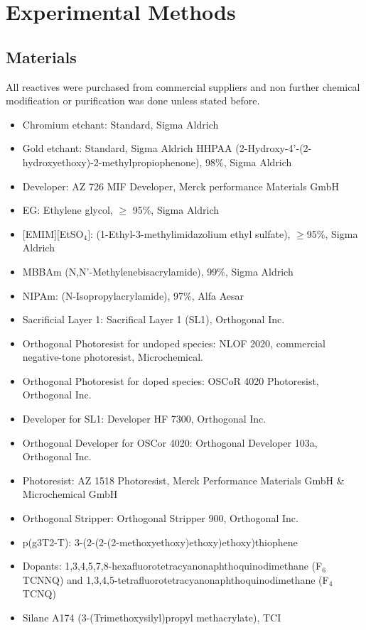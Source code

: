 {\chapter{Experimental Methods}}
\label{cha:2}

\section{Materials}
All reactives were purchased from commercial suppliers and non further chemical modification or purification was done unless stated before.

\begin{itemize}
\item Chromium etchant: Standard, Sigma Aldrich
\item Gold etchant: Standard, Sigma Aldrich HHPAA (2-Hydroxy-4’-(2-hydroxyethoxy)-2-methylpropiophenone), 98$\%$, Sigma Aldrich 
\item Developer: AZ 726 MIF Developer, Merck performance Materials GmbH
\item EG: Ethylene glycol, $\geq$ 95$\%$, Sigma Aldrich
\item $[$EMIM$][$EtSO$_{4}]$: (1-Ethyl-3-methylimidazolium ethyl sulfate), $\geq$95$\%$, Sigma Aldrich 
\item MBBAm (N,N’-Methylenebisacrylamide), 99$\%$, Sigma Aldrich 
\item NIPAm: (N-Isopropylacrylamide), 97$\%$, Alfa Aesar 
\item Sacrificial Layer 1: Sacrifical Layer 1 (SL1), Orthogonal Inc. 
\item Orthogonal Photoresist for undoped species: NLOF 2020, commercial negative-tone photoresist, Microchemical.
\item Orthogonal Photoresist for doped species: OSCoR 4020 Photoresist, Orthogonal Inc.
\item Developer for SL1: Developer HF 7300, Orthogonal Inc.
\item Orthogonal Developer for OSCor 4020: Orthogonal Developer 103a, Orthogonal Inc.
\item Photoresist: AZ 1518 Photoresist, Merck Performance Materials GmbH \& Microchemical GmbH 
\item Orthogonal Stripper: Orthogonal Stripper 900, Orthogonal Inc. 
\item p(g3T2-T): 3-(2-(2-(2-methoxyethoxy)ethoxy)ethoxy)thiophene
\item Dopants: 1,3,4,5,7,8-hexafluorotetracyanonaphthoquinodimethane (F$_{6}$TCNNQ) and 1,3,4,5-tetrafluorotetracyanonaphthoquinodimethane (F$_{4}$TCNQ)
\item Silane A174 (3-(Trimethoxysilyl)propyl methacrylate), TCI

\end{itemize}

